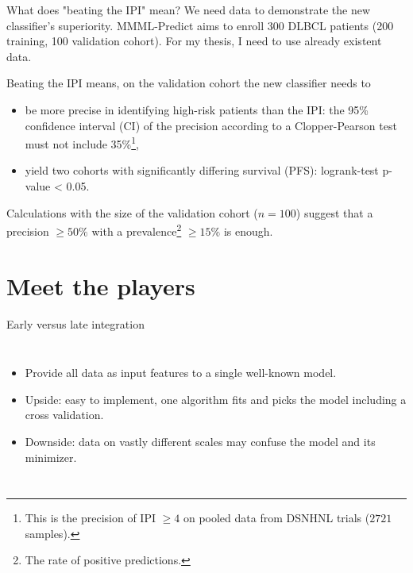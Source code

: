 \documentclass[10pt, aspectratio=169]{beamer}
\begin{document}
\begin{frame}{What does "beating the IPI" mean?}
  We need data to demonstrate the new classifier's superiority. MMML-Predict aims to enroll 300 DLBCL 
  patients (200 training, 100 validation cohort). For my thesis, I need to use already existent data.

  Beating the IPI means, on the validation cohort the new classifier needs to 

  \begin{itemize}
    \item be \alert{more precise in identifying high-risk patients} than the IPI: the 95\% confidence interval (CI) 
    of the precision according to a Clopper-Pearson test 
    must not include 35\%\footnote{This is the  precision of IPI $\geq 4$ on pooled data from DSNHNL trials 
    ($\num{2721}$ samples).},
    \item yield \alert{two cohorts with significantly differing survival} (PFS): logrank-test p-value < 0.05.
  \end{itemize}

  Calculations with the size of the validation cohort ($n = 100$) suggest that a precision $\geq 50\%$ with a 
  prevalence\footnote{The rate of positive predictions.} $\geq 15\%$ is enough.
\end{frame}

\section{Meet the players}

\begin{frame}{\alert{Early} versus late integration}
  \begin{columns}
      \centering
      \begin{itemize}
        \item Provide all data as input features to a single well-known model.
        \item Upside: easy to implement, one algorithm fits and picks the model 
          including a cross validation.
        \item Downside: data on vastly different scales may confuse the model and 
          its minimizer.
      \end{itemize}
  \end{columns}
\end{frame}
\end{document}
